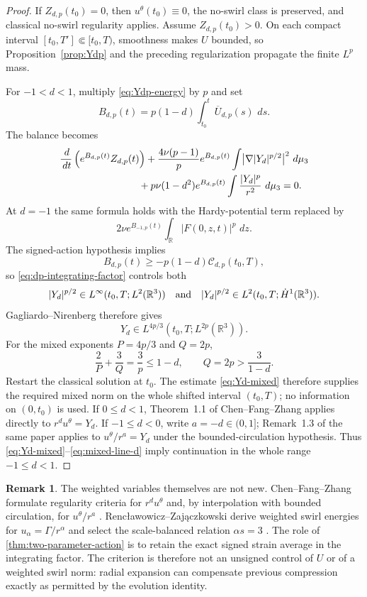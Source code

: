 \documentclass[11pt]{article}
\numberwithin{equation}{section}
\theoremstyle{definition}
\newtheorem{remark}[remark]{Remark}
\newcommand{\R}{\mathbb R}
\newcommand{\dd}{\,d}
\begin{document}
\begin{proof}
If $Z_{d,p}(t_0)=0$, then $u^\theta(t_0)\equiv0$, the no-swirl class is preserved, and classical no-swirl regularity applies.  Assume $Z_{d,p}(t_0)>0$.  On each compact interval $[t_0,T']\Subset[t_0,T)$, smoothness makes $U$ bounded, so Proposition~\ref{prop:Ydp} and the preceding regularization propagate the finite $L^p$ mass.

For $-1<d<1$, multiply \eqref{eq:Ydp-energy} by $p$ and set
\[
 B_{d,p}(t)=p(1-d)\int_{t_0}^t\overline U_{d,p}(s)\,\dd s.
\]
The balance becomes
\begin{align}\label{eq:dp-integrating-factor}
 &\frac{\dd}{\dd t}\left(e^{B_{d,p}(t)}Z_{d,p}(t)\right)
 +\frac{4\nu(p-1)}p e^{B_{d,p}(t)}
   \int\bigl|\nabla |Y_d|^{p/2}\bigr|^2\,\dd\mu_3\\
 &\hspace{28mm}
 +p\nu(1-d^2)e^{B_{d,p}(t)}
   \int\frac{|Y_d|^p}{r^2}\,\dd\mu_3=0.
\end{align}
At $d=-1$ the same formula holds with the Hardy-potential term replaced by
\[
 2\nu e^{B_{-1,p}(t)}\int_\R|F(0,z,t)|^p\,\dd z.
\]
The signed-action hypothesis implies
\[
 B_{d,p}(t)\ge-p(1-d)\mathcal C_{d,p}(t_0,T),
\]
so \eqref{eq:dp-integrating-factor} controls both
\[
 |Y_d|^{p/2}\in L^\infty(t_0,T;L^2(\R^3))
 \quad\hbox{and}\quad
 |Y_d|^{p/2}\in L^2(t_0,T;\dot H^1(\R^3)).
\]
Gagliardo--Nirenberg therefore gives
\begin{equation}\label{eq:Yd-mixed}
 Y_d\in L^{4p/3}(t_0,T;L^{2p}(\R^3)).
\end{equation}
For the mixed exponents $P=4p/3$ and $Q=2p$,
\begin{equation}\label{eq:mixed-line-d}
 \frac2P+\frac3Q=\frac3p\le1-d,
 \qquad
 Q=2p>\frac3{1-d}.
\end{equation}
Restart the classical solution at $t_0$.  The estimate \eqref{eq:Yd-mixed} therefore supplies the required mixed norm on the whole shifted interval $(t_0,T)$; no information on $(0,t_0)$ is used.  If $0\le d<1$, Theorem~1.1 of Chen--Fang--Zhang \cite{ChenFangZhang2017} applies directly to $r^d u^\theta=Y_d$.  If $-1\le d<0$, write $a=-d\in(0,1]$; Remark~1.3 of the same paper applies to $u^\theta/r^a=Y_d$ under the bounded-circulation hypothesis.  Thus \eqref{eq:Yd-mixed}--\eqref{eq:mixed-line-d} imply continuation in the whole range $-1\le d<1$.
\end{proof}

\begin{remark}\label{rem:known-weighted-context}
The weighted variables themselves are not new.  Chen--Fang--Zhang formulate regularity criteria for $r^d u^\theta$ and, by interpolation with bounded circulation, for $u^\theta/r^a$ \cite{ChenFangZhang2017}.  Renc\l awowicz--Zaj\k aczkowski derive weighted swirl energies for $u_\alpha=\Gamma/r^\alpha$ and select the scale-balanced relation $\alpha s=3$ \cite{RenclawowiczZajaczkowski2019}.  The role of \cref{thm:two-parameter-action} is to retain the exact signed strain average in the integrating factor.  The criterion is therefore not an unsigned control of $U$ or of a weighted swirl norm: radial expansion can compensate previous compression exactly as permitted by the evolution identity.
\end{remark}
\end{document}
